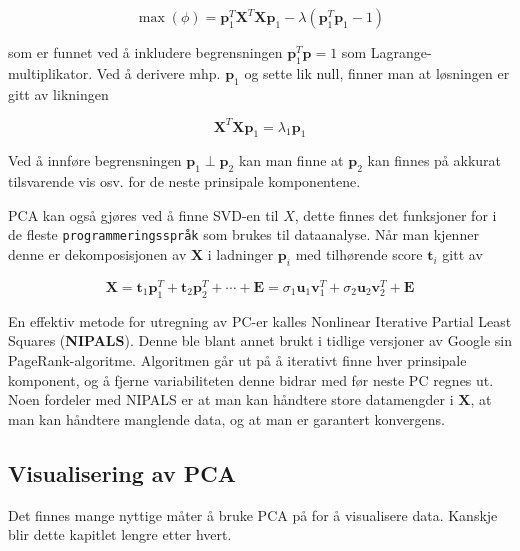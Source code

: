 \begin{equation}
	\max (\phi)=\boldsymbol{p}_{1}^{T} \boldsymbol{X}^{T} \boldsymbol{X} \boldsymbol{p}_{1}-\lambda\left(\boldsymbol{p}_{1}^{T} \boldsymbol{p}_{1}-1\right)
\end{equation}

som er funnet ved å inkludere begrensningen $\mathbf{p}_1^T \mathbf{p} = 1$ som Lagrange-multiplikator. Ved å derivere mhp. $\mathbf{p}_1$ og sette lik null, finner man at løsningen er gitt av likningen

\begin{equation}
	\mathbf{X}^T \mathbf{X} \mathbf{p}_1 = \lambda_1 \mathbf{p}_1
\end{equation}

Ved å innføre begrensningen $\mathbf{p}_1 \perp \mathbf{p}_2$ kan man finne at $\mathbf{p}_2$ kan finnes på akkurat tilsvarende vis osv. for de neste prinsipale komponentene.

PCA kan også gjøres ved å finne SVD-en til $X$, dette finnes det funksjoner for i de fleste \texttt{programmeringsspråk} som brukes til dataanalyse. Når man kjenner denne er dekomposisjonen av $\mathbf{X}$ i ladninger $\mathbf{p}_i$ med tilhørende score $\mathbf{t}_i$ gitt av

\begin{equation}
	\mathbf{X} = \mathbf{t}_1 \mathbf{p}_1^T + \mathbf{t}_2 \mathbf{p}_2^T + \cdots + \mathbf{E} = \sigma_1 \mathbf{u}_1 \mathbf{v}_1^T +  \sigma_2 \mathbf{u}_2 \mathbf{v}_2^T + \mathbf{E} 
\end{equation}

En effektiv metode for utregning av PC-er kalles Nonlinear Iterative Partial Least Squares (\textbf{NIPALS}). Denne ble blant annet brukt i tidlige versjoner av Google sin PageRank-algoritme. Algoritmen går ut på å iterativt finne hver prinsipale komponent, og å fjerne variabiliteten denne bidrar med før neste PC regnes ut. Noen fordeler med NIPALS er at man kan håndtere store datamengder i $\mathbf{X}$, at man kan håndtere manglende data, og at man er garantert konvergens.

\subsection{Visualisering av PCA}
Det finnes mange nyttige måter å bruke PCA på for å visualisere data. Kanskje blir dette kapitlet lengre etter hvert.

